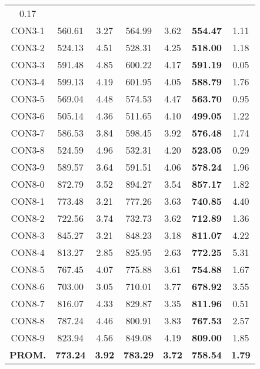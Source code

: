 \begin{table}[h]
\begin{tabular}{c c c c c c c}
0.17\\CON3-1 & 560.61 & 3.27 & 
564.99 & 3.62 & \bf{554.47} & 
1.11\\CON3-2 & 524.13 & 4.51 & 
528.31 & 4.25 & \bf{518.00} & 
1.18\\CON3-3 & 591.48 & 4.85 & 
600.22 & 4.17 & \bf{591.19} & 
0.05\\CON3-4 & 599.13 & 4.19 & 
601.95 & 4.05 & \bf{588.79} & 
1.76\\CON3-5 & 569.04 & 4.48 & 
574.53 & 4.47 & \bf{563.70} & 
0.95\\CON3-6 & 505.14 & 4.36 & 
511.65 & 4.10 & \bf{499.05} & 
1.22\\CON3-7 & 586.53 & 3.84 & 
598.45 & 3.92 & \bf{576.48} & 
1.74\\CON3-8 & 524.59 & 4.96 & 
532.31 & 4.20 & \bf{523.05} & 
0.29\\CON3-9 & 589.57 & 3.64 & 
591.51 & 4.06 & \bf{578.24} & 
1.96\\CON8-0 & 872.79 & 3.52 & 
894.27 & 3.54 & \bf{857.17} & 
1.82\\CON8-1 & 773.48 & 3.21 & 
777.26 & 3.63 & \bf{740.85} & 
4.40\\CON8-2 & 722.56 & 3.74 & 
732.73 & 3.62 & \bf{712.89} & 
1.36\\CON8-3 & 845.27 & 3.21 & 
848.23 & 3.18 & \bf{811.07} & 
4.22\\CON8-4 & 813.27 & 2.85 & 
825.95 & 2.63 & \bf{772.25} & 
5.31\\CON8-5 & 767.45 & 4.07 & 
775.88 & 3.61 & \bf{754.88} & 
1.67\\CON8-6 & 703.00 & 3.05 & 
710.01 & 3.77 & \bf{678.92} & 
3.55\\CON8-7 & 816.07 & 4.33 & 
829.87 & 3.35 & \bf{811.96} & 
0.51\\CON8-8 & 787.24 & 4.46 & 
800.91 & 3.83 & \bf{767.53} & 
2.57\\CON8-9 & 823.94 & 4.56 & 
849.08 & 4.19 & \bf{809.00} & 
1.85\\\bf{PROM.} & 
\bf{773.24} & \bf{3.92} & \bf{783.29} & \bf{3.72} & \bf{758.54} & \bf{1.79}\\[1ex]\hline
\end{tabular}
\label{table:ILS-VND-M-25-40}
\end{table}


